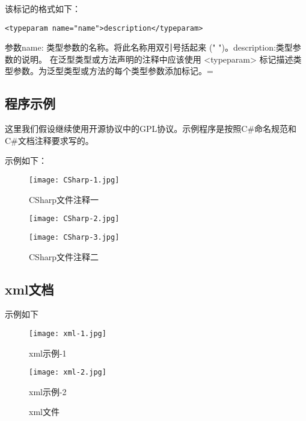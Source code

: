 \begin{enumerate}
该标记的格式如下：
\begin{lstlisting}
<typeparam name="name">description</typeparam>
\end{lstlisting}
参数name: 类型参数的名称。将此名称用双引号括起来 (" ")。description:类型参数的说明。
在泛型类型或方法声明的注释中应该使用 <typeparam> 标记描述类型参数。为泛型类型或方法的每个类型参数添加标记。=

\end{enumerate}

\newpage
\subsection{程序示例}

这里我们假设继续使用开源协议中的GPL协议。示例程序是按照C\#命名规范和C\#文档注释要求写的。

示例如下：
\begin{figure}[htpd]
 \centering
 \texttt{[image: CSharp-1.jpg]}
 \caption{CSharp文件注释一}
\end{figure}

\begin{figure}[htpd] 
 \centering 
 \begin{minipage}[t]{0.5\textwidth} 
   \centering 
   \texttt{[image: CSharp-2.jpg]} 
 \end{minipage}%
 \begin{minipage}[t]{0.5\textwidth} 
   \centering 
   \texttt{[image: CSharp-3.jpg]} 
 \end{minipage}%
 \caption{ CSharp文件注释二}
\end{figure}

\newpage	 
\subsection{xml文档}

示例如下

\begin{figure}[htpd]
  \centering 
  \begin{minipage}[t]{0.5\textwidth} 
    \centering 
    \texttt{[image: xml-1.jpg]} 
    \caption{xml示例-1} 
  \end{minipage}%
  \begin{minipage}[t]{0.5\textwidth} 
    \centering 
    \texttt{[image: xml-2.jpg]} 
    \caption{xml示例-2} 
  \end{minipage}%
  \caption{ xml文件}
\end{figure}

